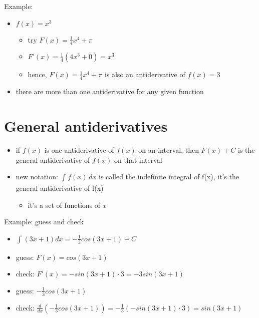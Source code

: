 \documentclass{article}
\begin{document}
Example:
\begin{itemize}
    \item $f(x) = x^3$
    \begin{itemize}
        \item try $F(x) = \frac{1}{4}x^4 + \pi$
        \item $F'(x) = \frac{1}{4}(4x^3+0) = x^3$
        \item hence, $F(x) = \frac{1}{4}x^4 + \pi$ is also an antiderivative of $f(x) = 3$
    \end{itemize}
\item there are more than one antiderivative for any given function
\end{itemize}
\section*{General antiderivatives}
\begin{itemize}
    \item if $f(x)$ is one antiderivative of $f(x)$ on an interval, then $F(x) + C$ is the general antiderivative of $f(x)$ on that interval
    \item new notation: $\int_{}^{} f(x)  \,dx $ is called the indefinite integral of f(x), it's the general antiderivative of f(x)
    \begin{itemize}
        \item it's a set of functions of $x$
    \end{itemize}
\end{itemize}
Example: guess and check
\begin{itemize}
    \item $\int_{}^{} (3x+1)dx = -\frac{1}{3}cos(3x+1) + C$
    \item guess: $F(x) = cos(3x+1)$
    \item check: $F'(x) = -sin(3x+1) \cdot 3 = -3sin(3x+1)$
    \item guess: $-\frac{1}{3}cos(3x+1)$
    \item check: $\frac{d}{dx}(-\frac{1}{3}cos(3x+1)) = -\frac{1}{3}(-sin(3x+1) \cdot 3) = sin(3x+1)$
\end{itemize}
\end{document}
